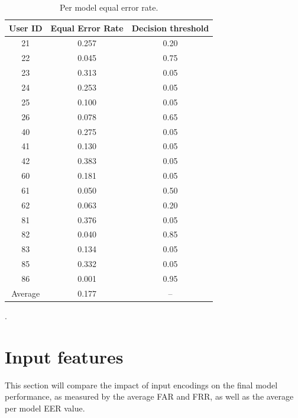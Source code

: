 \begin{center}
	\begin{table}[H]
		\begin{center}
			\begin{tabular}{ |c|c|c| } 
				\hline
				User ID & Equal Error Rate & Decision threshold \\
				\hline
				21 & 0.257 & 0.20 \\
				\hline
				22 & 0.045 & 0.75 \\
				\hline
				23 & 0.313 & 0.05 \\
				\hline
				24 & 0.253 & 0.05 \\
				\hline
				25 & 0.100 & 0.05 \\
				\hline
				26 & 0.078 & 0.65 \\
				\hline
				40 & 0.275 & 0.05 \\
				\hline
				41 & 0.130 & 0.05 \\
				\hline
				42 & 0.383 & 0.05 \\
				\hline
				60 & 0.181 & 0.05 \\
				\hline
				61 & 0.050 & 0.50 \\
				\hline
				62 & 0.063 & 0.20 \\
				\hline
				81 & 0.376 & 0.05 \\
				\hline
				82 & 0.040 & 0.85 \\
				\hline
				83 & 0.134 & 0.05 \\
				\hline
				85 & 0.332 & 0.05 \\
				\hline
				86 & 0.001 & 0.95 \\
				\hline
				\hline
				Average & 0.177 & -- \\
				\hline
			\end{tabular}
		\end{center}
		\caption{Per model equal error rate.}
		\label{table:EER_separate}
	\end{table}
\end{center}

.


\section{Input features}
This section will compare the impact of input encodings on the final model performance, as measured by the average FAR and FRR, as well as the average per model EER value.

